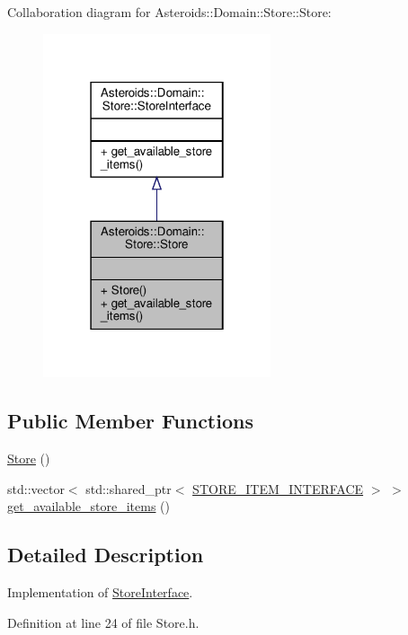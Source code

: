 Collaboration diagram for Asteroids\+:\+:Domain\+:\+:Store\+:\+:Store\+:\nopagebreak
\begin{figure}[H]
\begin{center}
\leavevmode
\includegraphics[width=190pt]{classAsteroids_1_1Domain_1_1Store_1_1Store__coll__graph}
\end{center}
\end{figure}
\subsection*{Public Member Functions}
\begin{DoxyCompactItemize}
\item 
\hyperlink{classAsteroids_1_1Domain_1_1Store_1_1Store_ae05082847458419f620061b2e1bd6d09}{Store} ()
\item 
std\+::vector$<$ std\+::shared\+\_\+ptr$<$ \hyperlink{classAsteroids_1_1Domain_1_1Store_1_1STORE__ITEM__INTERFACE}{S\+T\+O\+R\+E\+\_\+\+I\+T\+E\+M\+\_\+\+I\+N\+T\+E\+R\+F\+A\+CE} $>$ $>$ \hyperlink{classAsteroids_1_1Domain_1_1Store_1_1Store_a6263ac0a86f49fb2ddf89c93d7cf9015}{get\+\_\+available\+\_\+store\+\_\+items} ()
\end{DoxyCompactItemize}


\subsection{Detailed Description}
Implementation of \hyperlink{classAsteroids_1_1Domain_1_1Store_1_1StoreInterface}{Store\+Interface}. 

Definition at line 24 of file Store.\+h.



